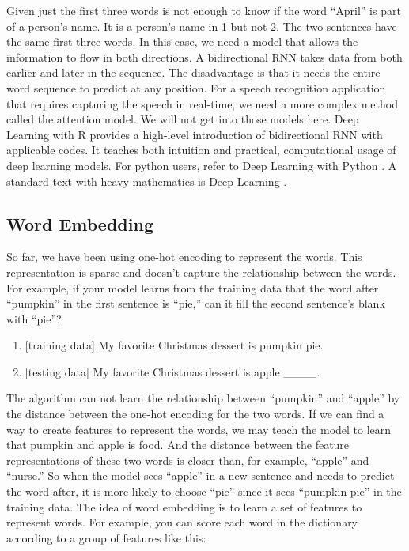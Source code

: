 \documentclass[12pt,]{krantz}
\providecommand{\tightlist}{%
  \setlength{\itemsep}{0pt}\setlength{\parskip}{0pt}}
\begin{document}
Given just the first three words is not enough to know if the word ``April'' is part of a person's name. It is a person's name in 1 but not 2. The two sentences have the same first three words. In this case, we need a model that allows the information to flow in both directions. A bidirectional RNN takes data from both earlier and later in the sequence. The disadvantage is that it needs the entire word sequence to predict at any position. For a speech recognition application that requires capturing the speech in real-time, we need a more complex method called the attention model. We will not get into those models here. Deep Learning with R \citep{deeplearningr18} provides a high-level introduction of bidirectional RNN with applicable codes. It teaches both intuition and practical, computational usage of deep learning models. For python users, refer to Deep Learning with Python \citep{deeplearningpy17}. A standard text with heavy mathematics is Deep Learning \citep{Goodfellow-et-al-2016}.

\hypertarget{embedding}{%
\subsection{Word Embedding}\label{embedding}}

So far, we have been using one-hot encoding to represent the words. This representation is sparse and doesn't capture the relationship between the words. For example, if your model learns from the training data that the word after ``pumpkin'' in the first sentence is ``pie,'' can it fill the second sentence's blank with ``pie''?

\begin{enumerate}
\def\labelenumi{\arabic{enumi}.}
\tightlist
\item
  {[}training data{]} My favorite Christmas dessert is pumpkin pie.
\item
  {[}testing data{]} My favorite Christmas dessert is apple \_\_\_\_.
\end{enumerate}

The algorithm can not learn the relationship between ``pumpkin'' and ``apple'' by the distance between the one-hot encoding for the two words. If we can find a way to create features to represent the words, we may teach the model to learn that pumpkin and apple is food. And the distance between the feature representations of these two words is closer than, for example, ``apple'' and ``nurse.'' So when the model sees ``apple'' in a new sentence and needs to predict the word after, it is more likely to choose ``pie'' since it sees ``pumpkin pie'' in the training data. The idea of word embedding is to learn a set of features to represent words. For example, you can score each word in the dictionary according to a group of features like this:
\end{document}
